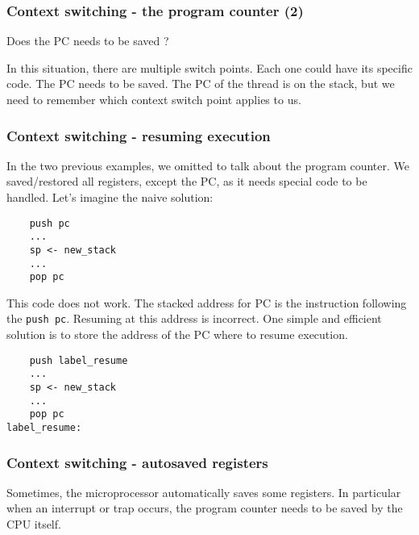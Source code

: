 
\begin{frame}[containsverbatim]
  \frametitle{Context switching - the program counter (2)}

  Does the PC needs to be saved ?

  \begin{center}
  \end{center}

  In this situation, there are multiple switch points. Each one could
  have its specific code. The PC needs to be saved. The PC of the
  thread is on the stack, but we need to remember which context switch
  point applies to us.

\end{frame}


\begin{frame}[containsverbatim]
  \frametitle{Context switching - resuming execution}

  In the two previous examples, we omitted to talk about the program
  counter. We saved/restored all registers, except the PC, as it needs
  special code to be handled. Let's imagine the naive solution:

  \begin{verbatim}
    push pc
    ...
    sp <- new_stack
    ...
    pop pc
  \end{verbatim}

  This code does not work. The stacked address for PC is the
  instruction following the \verb|push pc|. Resuming at this address
  is incorrect. One simple and efficient solution is to store the
  address of the PC where to resume execution.

  \begin{verbatim}
    push label_resume
    ...
    sp <- new_stack
    ...
    pop pc
label_resume:
  \end{verbatim}

\end{frame}


\begin{frame}
  \frametitle{Context switching - autosaved registers}

  Sometimes, the microprocessor automatically saves some registers. In
  particular when an interrupt or trap occurs, the program counter
  needs to be saved by the CPU itself.

\end{frame}

